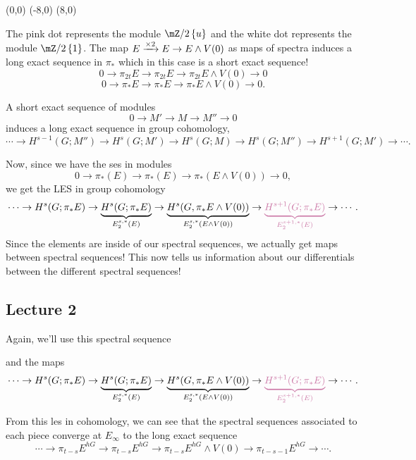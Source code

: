 \begin{sseqdata}[name = EwedgeV0,Adams grading]
        \tenamwednesday(0,0)
        \tenamwednesday(-8,0)
        \tenamwednesday(8,0)
\end{sseqdata}
\begin{center}
    \printpage[name=EwedgeV0,x range = {0}{16}, y range = {0}{6},xscale =.75,grid = chess]
\end{center}
The pink dot represents the module $\mZ/2\sets{u}$ and the white dot represents the module $\mZ/2\sets{1}$. The map $E\xrightarrow{\times 2}E\to E\wedge V(0)$ as maps of spectra induces a long exact sequence in $\pi_\ast$ which in this case is a short exact sequence! $$0\to \pi_{2t}E\to \pi_{2t}E\to \pi_{2t}E\wedge V(0)\to 0$$ $$0\to \pi_{\ast}E\to \pi_{\ast}E\to \pi_{\ast}E\wedge V(0)\to 0.$$
\begin{fact}{}{}
    A short exact sequence of modules $$0\to M'\to M\to M''\to 0$$ induces a long exact sequence in group cohomology, $$\cdots \to H^{s-1}(G;M'')\to H^s(G;M')\to H^s(G;M)\to H^s(G;M'')\to H^{s+1}(G;M')\to \cdots.$$
\end{fact}
Now, since we have the ses in modules $$0\to \pi_\ast(E)\to\pi_\ast(E)\to\pi_\ast(E\wedge V(0))\to 0,$$ we get the LES in group cohomology $$\cdots \to H^s(G;\pi_\ast E)\to \underbrace{H^s(G;\pi_\ast E)}_{E_2^{s,\ast}(E)}\to \underbrace{H^s(G,\pi_\ast E\wedge V(0))}_{E_2^{s,\ast}(E\wedge V(0))}\to \textcolor{wongpink}{\underbrace{H^{s+1}(G;\pi_{\ast}E)}_{E_2^{s+1,\ast}(E)}}\to \cdots.$$ Since the elements are inside of our spectral sequences, we actually get maps between spectral sequences! This now tells us information about our differentials between the different spectral sequences!

\newpage
\subsection{Lecture 2}

Again, we'll use this spectral sequence
\begin{center}
    \printpage[name=EwedgeV0,x range = {0}{16}, y range = {0}{6},xscale =.75,grid = chess]
\end{center}
and the maps 
$$\cdots \to H^s(G;\pi_\ast E)\to \underbrace{H^s(G;\pi_\ast E)}_{E_2^{s,\ast}(E)}\to \underbrace{H^s(G,\pi_\ast E\wedge V(0))}_{E_2^{s,\ast}(E\wedge V(0))}\to \textcolor{wongpink}{\underbrace{H^{s+1}(G;\pi_{\ast}E)}_{E_2^{s+1,\ast}(E)}}\to \cdots.$$

From this les in cohomology, we can see that the spectral sequences associated to each piece converge at $E_\infty$ to the long exact sequence $$\cdots \to \pi_{t-s}E^{hG}\to \pi_{t-s}E^{hG}\to \pi_{t-s}E^{hG}\wedge V(0)\to \pi_{t-s-1}E^{hG}\to \cdots.$$

